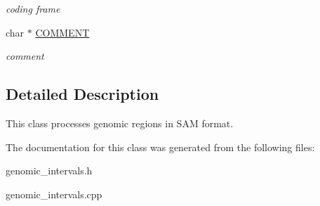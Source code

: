 \begin{DoxyCompactItemize}
\begin{DoxyCompactList}\small\item\em coding frame \end{DoxyCompactList}\item 
\hypertarget{classGenomicRegionGFF_a625a023f1bb24fc597e723919a036073}{
char $\ast$ \hyperlink{classGenomicRegionGFF_a625a023f1bb24fc597e723919a036073}{COMMENT}}
\label{classGenomicRegionGFF_a625a023f1bb24fc597e723919a036073}

\begin{DoxyCompactList}\small\item\em comment \end{DoxyCompactList}\end{DoxyCompactItemize}


\subsection{Detailed Description}
This class processes genomic regions in SAM format. 

The documentation for this class was generated from the following files:\begin{DoxyCompactItemize}
\item 
genomic\_\-intervals.h\item 
genomic\_\-intervals.cpp\end{DoxyCompactItemize}
